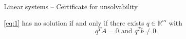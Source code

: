  \begin{frame}{Linear systems -- Certificate for unsolvability}
    
    \begin{theorem}
      \eqref{eq:1} has no solution if and only if there exists $q ∈ ℝ^m$ with
      \begin{displaymath}
        q^T A = 0 \text{ and } q^T b ≠ 0. 
      \end{displaymath}
      
    \end{theorem}
    
  \end{frame}
\begin{frame}{}

    \begin{columns}
      \begin{column}{.5\textwidth}

      \end{column}
      \begin{column}{.5\textwidth}

      \end{column}       
    \end{columns}
  \end{frame}  
   
\begin{frame}{}

    \begin{columns}
      \begin{column}{.5\textwidth}

      \end{column}
      \begin{column}{.5\textwidth}

      \end{column}       
    \end{columns}
  \end{frame}  
   
